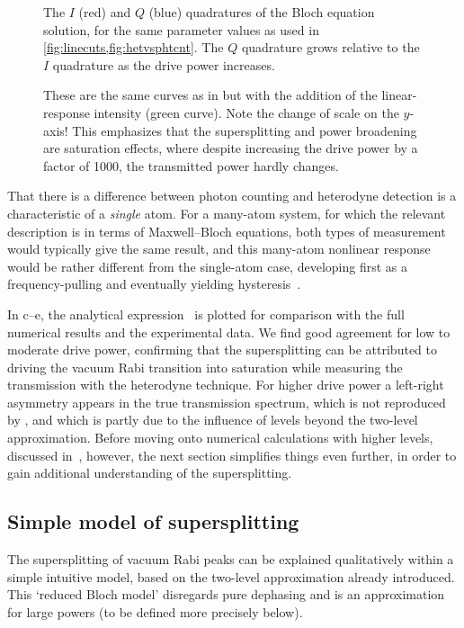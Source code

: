  \begin{figure}
 \centering
 \caption[Quadratures of the vacuum Rabi signal] { The $I$ (red) and $Q$ (blue) quadratures of the Bloch equation solution, for the same parameter values as used in \cref{fig:linecuts,fig:hetvsphtcnt}. The $Q$ quadrature grows relative to the $I$ quadrature as the drive power increases.\label{fig:relim}}
 \end{figure}%
\begin{figure}
 \centering
 \caption[Supersplitting: Heterodyne vs photon counting vs linear response]
 { These are the same curves as in  but with the addition of the linear-response intensity (green curve). Note the change of scale on the $y$-axis! This emphasizes that the supersplitting and power broadening are saturation effects, where despite increasing the drive power by a factor of 1000, the transmitted power hardly changes.\label{fig:hetvsphtvslnr}}
 \end{figure}

That there is a difference between photon counting and heterodyne detection is a characteristic of a \textit{single} atom. For a many-atom system, for which the relevant description is in terms of Maxwell--Bloch equations, both types of measurement would typically give the same result, and this many-atom nonlinear response would be rather different from the single-atom case, developing first as a frequency-pulling and eventually yielding hysteresis~\cite{carm3}.

 In c--e, the analytical expression~ is plotted for comparison with the full
numerical results and the experimental data. We find good agreement for low to moderate drive power, confirming that the supersplitting can be attributed to driving the vacuum Rabi transition into saturation while measuring the transmission with the heterodyne technique.  For higher drive power a left-right asymmetry appears in the true transmission spectrum, which is not reproduced by , and which is partly due to the influence of levels beyond the two-level approximation. Before moving onto numerical calculations with higher levels, discussed in~, however, the next section simplifies things even further, in order to gain additional understanding of the supersplitting.
%
\subsection{Simple model of supersplitting}
\label{sec:simplesuper}
The supersplitting of vacuum Rabi peaks can be explained qualitatively within a simple intuitive model, based on the two-level approximation already introduced. This `reduced Bloch model' disregards pure dephasing and is an approximation for large powers (to be defined more precisely below).

